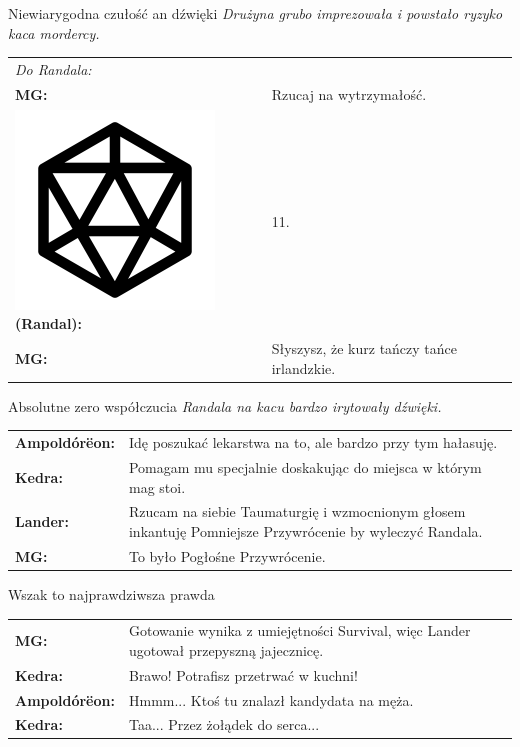 \documentclass[10pt,twoside,twocolumn]{book}
\begin{document}
\begin{rpg-quotebox}{Niewiarygodna czułość an dźwięki}
   \textit{Drużyna grubo imprezowała i powstało ryzyko kaca mordercy.}\\

   \begin{tabularx}{\columnwidth}{lX}
      \multicolumn{2}{l}{\textit{Do Randala:}}\\
      \textbf{MG:} & Rzucaj na wytrzymałość.\\
      \includegraphics[scale=0.055]{img/d20.png}\textbf{(Randal):}& 11.\\
      \textbf{MG:} & Słyszysz, że kurz tańczy tańce irlandzkie.\\
   \end{tabularx}
\end{rpg-quotebox}


\begin{rpg-quotebox}{Absolutne zero współczucia}
   \textit{Randala na kacu bardzo irytowały dźwięki.}\\

   \begin{tabularx}{\columnwidth}{lX}
      \textbf{Ampoldórëon:} & Idę poszukać lekarstwa na to, ale bardzo przy tym hałasuję.\\
      \textbf{Kedra:} & Pomagam mu specjalnie doskakując do miejsca w którym mag stoi.\\
      \textbf{Lander:} & Rzucam na siebie Taumaturgię i wzmocnionym głosem inkantuję Pomniejsze Przywrócenie by wyleczyć Randala.\\
      \textbf{MG:} & To było Pogłośne Przywrócenie.\\
   \end{tabularx}
\end{rpg-quotebox}


\begin{rpg-quotebox}{Wszak to najprawdziwsza prawda}
   \begin{tabularx}{\columnwidth}{lX}
      \textbf{MG:} & Gotowanie wynika z umiejętności Survival, więc Lander ugotował przepyszną jajecznicę.\\
      \textbf{Kedra:} & Brawo! Potrafisz przetrwać w kuchni!\\
      \textbf{Ampoldórëon:} & Hmmm... Ktoś tu znalazł kandydata na męża.\\
      \textbf{Kedra:} & Taa... Przez żołądek do serca...\\
   \end{tabularx}
\end{rpg-quotebox}
\end{document}
